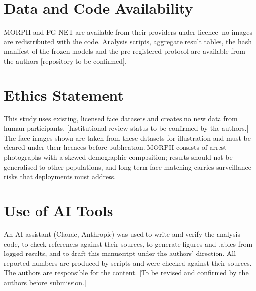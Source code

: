 \documentclass[journal]{IEEEtran}
\begin{document}
\section*{Data and Code Availability}
MORPH and FG-NET are available from their providers under licence; no images are redistributed with the code. Analysis scripts, aggregate result tables, the hash manifest of the frozen models and the pre-registered protocol are available from the authors [repository to be confirmed].

\section*{Ethics Statement}
This study uses existing, licensed face datasets and creates no new data from human participants. [Institutional review status to be confirmed by the authors.] The face images shown are taken from these datasets for illustration and must be cleared under their licences before publication. MORPH consists of arrest photographs with a skewed demographic composition; results should not be generalised to other populations, and long-term face matching carries surveillance risks that deployments must address.

\section*{Use of AI Tools}
An AI assistant (Claude, Anthropic) was used to write and verify the analysis code, to check references against their sources, to generate figures and tables from logged results, and to draft this manuscript under the authors' direction. All reported numbers are produced by scripts and were checked against their sources. The authors are responsible for the content. [To be revised and confirmed by the authors before submission.]



\end{document}
